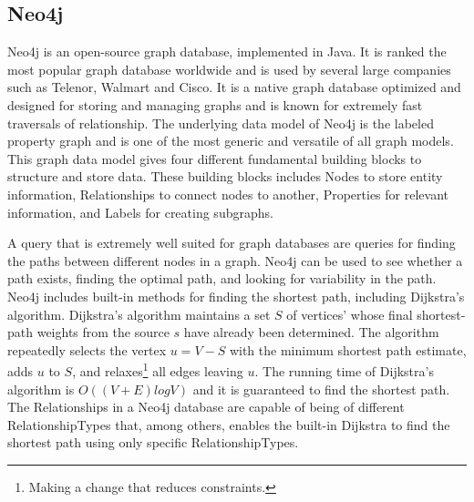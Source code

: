 \subsection{Neo4j}
\label{subsubsec:neo4j}
Neo4j\citep{website:neo4j} is an open-source graph database, implemented in Java. It is ranked the most popular graph database worldwide \citep{website:graphdbranking} and is used by several large companies such as Telenor\citep{website:telenor}, Walmart\citep{website:walmart} and Cisco\citep{website:cisco}. It is a native graph database optimized and designed for storing and managing graphs and is known for extremely fast traversals of relationship. The underlying data model of Neo4j is the labeled property graph and is one of the most generic and versatile of all graph models\citep[p.73]{robinson13}. This graph data model gives four different fundamental building blocks to structure and store data. These building blocks includes Nodes to store entity information, Relationships to connect nodes to another, Properties for relevant information, and Labels for creating subgraphs.

A query that is extremely well suited for graph databases are queries for finding the paths between different nodes in a graph. Neo4j can be used to see whether a path exists, finding the optimal path, and looking for variability in the path\citep[p. 51]{bruggen14}. Neo4j includes built-in methods for finding the shortest path, including Dijkstra's algorithm. Dijkstra's algorithm \cite[p.658-662]{cormen09} maintains a set $S$ of vertices' whose final shortest-path weights from the source $s$ have already been determined. The algorithm repeatedly selects the vertex $u = V - S$ with the minimum shortest path estimate, adds $u$ to $S$, and relaxes\footnote{Making a change that reduces constraints.} all edges leaving $u$. The running time of Dijkstra's algorithm is $O((V + E)log V)$ and it is guaranteed to find the shortest path\cite[p.~661]{cormen09}. %
The Relationships in a Neo4j database are capable of being of different RelationshipTypes that, among others, enables the built-in Dijkstra to find the shortest path using only specific RelationshipTypes.



